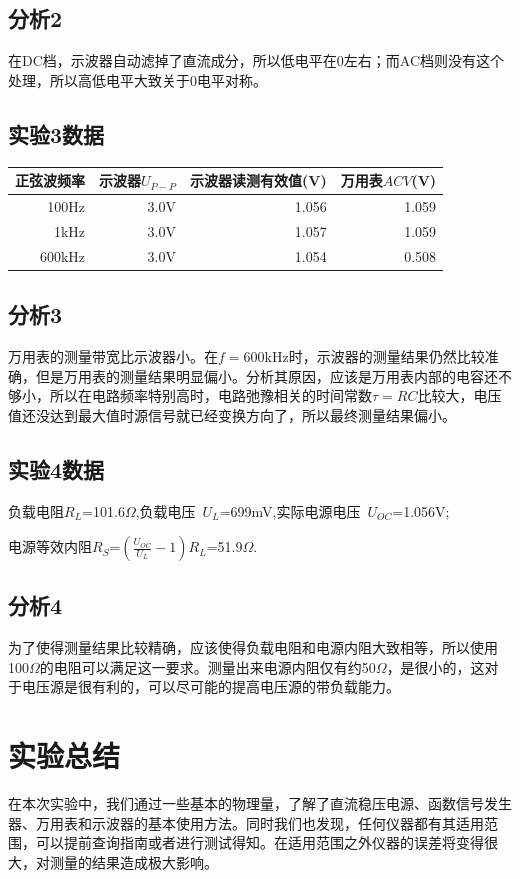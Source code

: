 \documentclass[a4paper,11pt,UTF8]{ctexart}
\begin{document}
\subsection{分析2}
	在DC档，示波器自动滤掉了直流成分，所以低电平在0左右；而AC档则没有这个处理，所以高低电平大致关于0电平对称。
\subsection{实验3数据}
	\begin{center}
	\begin{tabular}{|r|r|r|r|}\hline
	正弦波频率 & 示波器$U_{P-P}$ & 示波器读测有效值(V) & 万用表$ACV$(V)\\\hline
	100Hz & 3.0V & 1.056 & 1.059\\\hline
	1kHz & 3.0V & 1.057 & 1.059\\\hline
	600kHz & 3.0V & 1.054 & 0.508\\\hline
		\end{tabular}
		\end{center}
\subsection{分析3}
	万用表的测量带宽比示波器小。在$f=600$kHz时，示波器的测量结果仍然比较准确，但是万用表的测量结果明显偏小。分析其原因，应该是万用表内部的电容还不够小，所以在电路频率特别高时，电路弛豫相关的时间常数$\tau=RC$比较大，电压值还没达到最大值时源信号就已经变换方向了，所以最终测量结果偏小。
\subsection{实验4数据}
	负载电阻$R_L$=101.6$\Omega$,负载电压~$U_L$=699mV,实际电源电压~$U_{OC}$=1.056V;\par
	电源等效内阻$R_S$=$\left( \frac{U_{OC}}{U_L}-1 \right)R_L$=51.9$\Omega$.
\subsection{分析4}
	为了使得测量结果比较精确，应该使得负载电阻和电源内阻大致相等，所以使用100$\Omega$的电阻可以满足这一要求。测量出来电源内阻仅有约50$\Omega$，是很小的，这对于电压源是很有利的，可以尽可能的提高电压源的带负载能力。
\section{实验总结}
	在本次实验中，我们通过一些基本的物理量，了解了直流稳压电源、函数信号发生器、万用表和示波器的基本使用方法。同时我们也发现，任何仪器都有其适用范围，可以提前查询指南或者进行测试得知。在适用范围之外仪器的误差将变得很大，对测量的结果造成极大影响。
\end{document}
